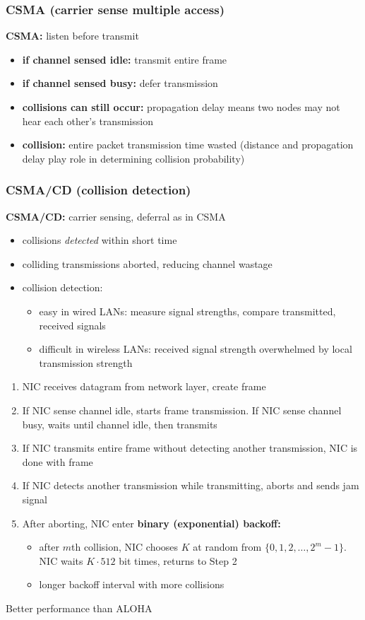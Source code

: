 \subsubsection{CSMA (carrier sense multiple access)}
\textbf{CSMA:} listen before transmit
\begin{itemize}
	\item \textbf{if channel sensed idle:} transmit entire frame
	\item \textbf{if channel sensed busy:} defer transmission
	\item \textbf{collisions can still occur:} propagation delay means two nodes may not hear each other's transmission
	\item \textbf{collision:} entire packet transmission time wasted (distance and propagation delay play role in determining collision probability)
\end{itemize}
\subsubsection{CSMA/CD (collision detection)}
\textbf{CSMA/CD:} carrier sensing, deferral as in CSMA
\begin{itemize}
	\item collisions \textit{detected} within short time
	\item colliding transmissions aborted, reducing channel wastage
	\item collision detection:
	\begin{itemize}
		\item easy in wired LANs: measure signal strengths, compare transmitted, received signals
		\item difficult in wireless LANs: received signal strength overwhelmed by local transmission strength
	\end{itemize}
\end{itemize}
\begin{enumerate}
	\item NIC receives datagram from network layer, create frame
	\item If NIC sense channel idle, starts frame transmission. If NIC sense channel busy, waits until channel idle, then transmits
	\item If NIC transmits entire frame without detecting another transmission, NIC is done with frame
	\item If NIC detects another transmission while transmitting, aborts and sends jam signal
	\item After aborting, NIC enter \textbf{binary (exponential) backoff:}
	\begin{itemize}
		\item after $m$th collision, NIC chooses $K$ at random from $\{ 0,1,2,\ldots,2^m-1 \}$. NIC waits $K\cdot512$ bit times, returns to Step 2
		\item longer backoff interval with more collisions
	\end{itemize}
\end{enumerate}
\begin{leftbar}
	Better performance than ALOHA
\end{leftbar}

